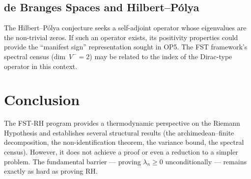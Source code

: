 \documentclass[12pt,a4paper]{article}
\theoremstyle{definition}
\theoremstyle{remark}
\begin{document}
\subsection{de Branges Spaces and Hilbert--P\'olya}
The Hilbert--P\'olya conjecture seeks a self-adjoint operator whose eigenvalues are the non-trivial zeros. If such an operator exists, its positivity properties could provide the ``manifest sign'' representation sought in OP5. The FST framework's spectral census (dim~$V^- = 2$) may be related to the index of the Dirac-type operator in this context.


\section{Conclusion}

The FST-RH program provides a thermodynamic perspective on the Riemann Hypothesis and establishes several structural results (the archimedean--finite decomposition, the non-identification theorem, the variance bound, the spectral census). However, it does not achieve a proof or even a reduction to a simpler problem. The fundamental barrier --- proving $\lambda_n \geq 0$ unconditionally --- remains exactly as hard as proving RH.
\end{document}
